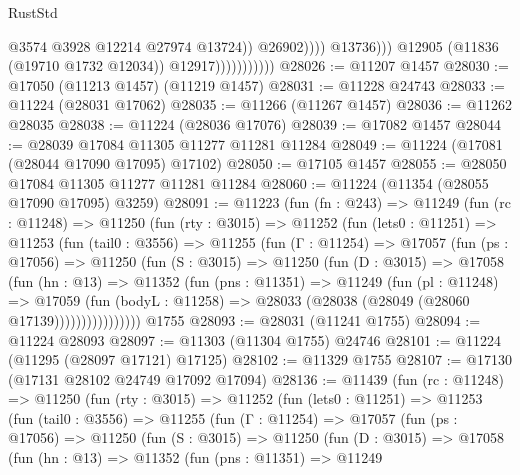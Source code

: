 \begin{lexlean}{RustStd}
\begin{coremodule}
                                            @3574
                                            @3928
                                            @12214
                                            @27974
                                            @13724))
                                        @26902))))
                                @13736)))
                          @12905
                          (@11836 (@19710 @1732 @12034))
                          @12917)))))))))))
@28026 := @11207 @1457
@28030 := @17050 (@11213 @1457) (@11219 @1457)
@28031 := @11228 @24743
@28033 := @11224 (@28031 @17062)
@28035 := @11266 (@11267 @1457)
@28036 := @11262 @28035
@28038 := @11224 (@28036 @17076)
@28039 := @17082 @1457
@28044 := @28039 @17084 @11305 @11277 @11281 @11284
@28049 := @11224 (@17081 (@28044 @17090 @17095) @17102)
@28050 := @17105 @1457
@28055 := @28050 @17084 @11305 @11277 @11281 @11284
@28060 := @11224 (@11354 (@28055 @17090 @17095) @3259)
@28091 := @11223
    (fun (fn : @243) =>
    @11249
      (fun (rc : @11248) =>
      @11250
        (fun (rty : @3015) =>
        @11252
          (fun (lets0 : @11251) =>
          @11253
            (fun (tail0 : @3556) =>
            @11255
              (fun (Γ : @11254) =>
              @17057
                (fun (ps : @17056) =>
                @11250
                  (fun (S : @3015) =>
                  @11250
                    (fun (D : @3015) =>
                    @17058
                      (fun (hn : @13) =>
                      @11352
                        (fun (pns : @11351) =>
                        @11249
                          (fun (pl : @11248) =>
                          @17059
                            (fun (bodyL : @11258) =>
                            @28033 (@28038 (@28049 (@28060 @17139))))))))))))))))
    @1755
@28093 := @28031 (@11241 @1755)
@28094 := @11224 @28093
@28097 := @11303 (@11304 @1755) @24746
@28101 := @11224 (@11295 (@28097 @17121) @17125)
@28102 := @11329 @1755
@28107 := @17130 (@17131 @28102 @24749 @17092 @17094)
@28136 := @11439
    (fun (rc : @11248) =>
    @11250
      (fun (rty : @3015) =>
      @11252
        (fun (lets0 : @11251) =>
        @11253
          (fun (tail0 : @3556) =>
          @11255
            (fun (Γ : @11254) =>
            @17057
              (fun (ps : @17056) =>
              @11250
                (fun (S : @3015) =>
                @11250
                  (fun (D : @3015) =>
                  @17058
                    (fun (hn : @13) =>
                    @11352
                      (fun (pns : @11351) =>
                      @11249

\end{coremodule}
\end{lexlean}
